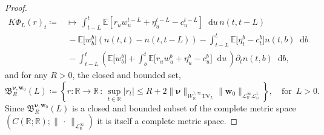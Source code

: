\documentclass[11pt,oneside,english,reqno,dvipsnames,table]{amsart}
\numberwithin{equation}{section}
\theoremstyle{plain}
\theoremstyle{definition}
\theoremstyle{remark}
\theoremstyle{plain}
\theoremstyle{plain}
\theoremstyle{plain}
\theoremstyle{plain}
\theoremstyle{plain}
\theoremstyle{plain}
\theoremstyle{plain}
\newcommand{\TV}{\text{TV}}
\newcommand{\bw}{\mathbf{w}}
\newcommand{\fB}{\mathfrak{B}}
\newcommand{\dd}{\mathop{}\!\mathrm{d}}
\newcommand{\mbE}{\mathbb{E}}
\newcommand{\mbR}{\mathbb{R}}
\newcommand{\msL}{\mathscr{L}}
\newcommand{\bnu}{\boldsymbol{\nu}}
\numberwithin{thm}{section}
\begin{document}
\begin{proof}
\begin{equation}
       \begin{aligned}
           K \Phi_L(r)_t \coloneqq  &\mapsto \,\int_{t-L}^{t} \mbE\left[r_u w^{t-L}_u  + \eta^{t-L}_u - c^{t-L}_u  \right] \dd u \,n(t,t-L)  \\
      &\,-\mbE\big[w^b_b\big]\left(n(t,t) -n(t,t-L)\right) -\int_{t-L}^{t} \mbE\big[\eta^b_{t} - c^b_{t}  \big]  n(t,b) \dd b\\
      &\,-  \int_{t-L}^{t}\left(\mbE\big[w^b_b\big] +\int_b^{t} \mbE\big[r_u w^b_u + \eta^b_u - c^b_u \big] \dd u \,\right)   \partial_t n(t,b) \dd b,
       \end{aligned}
   \end{equation}
and for any $R>0$, the closed and bounded set, %
%
\begin{equation}\label{eq:olg_rate_closed_set}
    \fB^{\bnu,\bw_0}_R(L) \coloneqq \left\{ r:\mbR\to \mbR \,:\, \sup_{t\in \mbR}|r_t| \leq R+2\|\bnu\|_{W^{1,\infty}_{\mbR}\TV_L} \|\bw_0\|_{\msL^\infty_\mbR \msL^1_\omega} \right\},\quad \text{for }\, L>0.
\end{equation}
Since $ \fB^{\bnu,\bw_0}_R(L)$ is a closed and bounded subset of the complete metric space $(C(\mbR;\mbR);\|\,\cdot\,\|_{\msL^\infty_{\mbR}})$ it is itself a complete metric space.
   

\end{proof}
\end{document}
